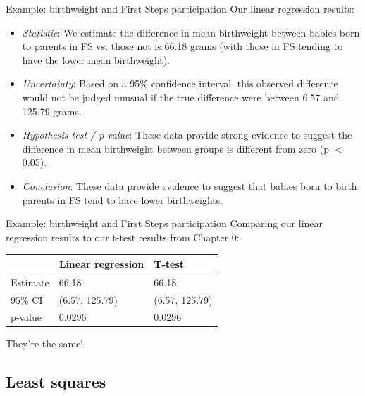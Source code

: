 \documentclass[10pt,t]{beamer}
\begin{document}
\begin{frame}{Example: birthweight and First Steps participation}
Our linear regression results:

\vspace{0.3cm}

\begin{itemize}
	\item \textit{Statistic}: We estimate the difference in mean birthweight between babies born to parents in FS vs. those not is 66.18 grams (with those in FS tending to have the lower mean birthweight). \pause
	\item \textit{Uncertainty}: Based on a 95\% confidence interval, this observed difference would not be judged unusual if the true difference were between 6.57 and 125.79 grams. \pause
	\item \textit{Hypothesis test / p-value}: These data provide strong evidence to suggest the difference in mean birthweight between groups is different from zero (p $<$ 0.05). \pause
	\item \textit{Conclusion}: These data provide evidence to suggest that babies born to birth parents in FS tend to have lower birthweights.
\end{itemize}
\end{frame}

\begin{frame}{Example: birthweight and First Steps participation}
Comparing our linear regression results to our t-test results from Chapter 0:

\vspace{0.3cm}

\begin{table}[]
	\begin{tabular}{l|ll}
		& Linear regression & T-test         \\ \hline
		Estimate & 66.18             & 66.18          \\ \hline
		95\% CI  & (6.57, 125.79)    & (6.57, 125.79) \\ \hline
		p-value  & 0.0296            & 0.0296        
	\end{tabular}
\end{table} \pause

\vspace{0.3cm}

They're the same!

\end{frame}

\subsection{Least squares}
\end{document}
